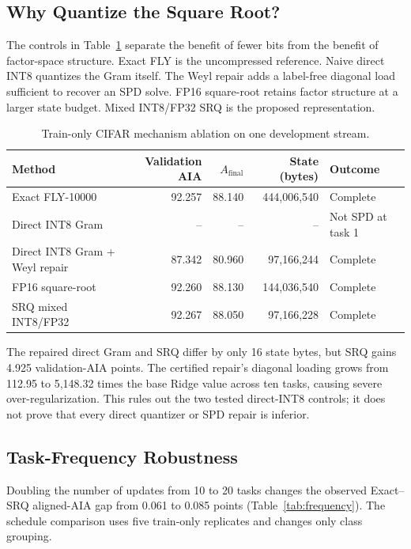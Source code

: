 \documentclass[runningheads]{llncs}
\begin{document}
\subsection{Why Quantize the Square Root?}

The controls in Table~\ref{tab:direct-control} separate the benefit of fewer
bits from the benefit of factor-space structure. Exact FLY is the uncompressed
reference. Naive direct INT8 quantizes the Gram itself. The Weyl repair adds a
label-free diagonal load sufficient to recover an SPD solve. FP16 square-root
retains factor structure at a larger state budget. Mixed INT8/FP32 SRQ is the
proposed representation.

\begin{table}
\caption{Train-only CIFAR mechanism ablation on one development stream.}
\label{tab:direct-control}
\centering
\small
\begin{tabular}{lrrrl}
\toprule
Method & Validation AIA & $A_{\mathrm{final}}$ & State (bytes) & Outcome \\
\midrule
Exact FLY-10000 & 92.257 & 88.140 & 444,006,540 & Complete \\
Direct INT8 Gram & -- & -- & -- & Not SPD at task 1 \\
Direct INT8 Gram + Weyl repair & 87.342 & 80.960 & 97,166,244 & Complete \\
FP16 square-root & 92.260 & 88.130 & 144,036,540 & Complete \\
SRQ mixed INT8/FP32 & 92.267 & 88.050 & 97,166,228 & Complete \\
\bottomrule
\end{tabular}
\end{table}

The repaired direct Gram and SRQ differ by only 16 state bytes, but SRQ gains
4.925 validation-AIA points. The certified repair's diagonal loading grows
from 112.95 to 5,148.32 times the base Ridge value across ten tasks, causing
severe over-regularization. This rules out the two tested direct-INT8 controls;
it does not prove that every direct quantizer or SPD repair is inferior.

\subsection{Task-Frequency Robustness}

Doubling the number of updates from 10 to 20 tasks changes the observed
Exact--SRQ aligned-AIA gap from 0.061 to 0.085 points
(Table~\ref{tab:frequency}). The schedule comparison uses five train-only
replicates and changes only class grouping.
\end{document}
